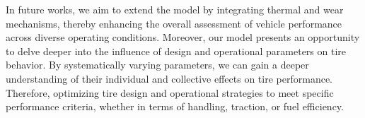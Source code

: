 In future works, we aim to extend the model by integrating thermal and wear mechanisms, thereby enhancing the overall assessment of vehicle performance across diverse operating conditions. Moreover, our model presents an opportunity to delve deeper into the influence of design and operational parameters on tire behavior. By systematically varying parameters, we can gain a deeper understanding of their individual and collective effects on tire performance. Therefore, optimizing tire design and operational strategies to meet specific performance criteria, whether in terms of handling, traction, or fuel efficiency.

